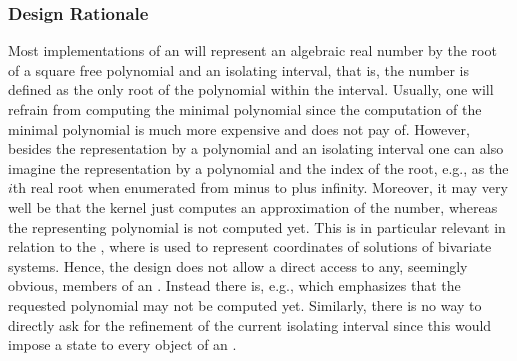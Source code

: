 \subsubsection{Design Rationale}

Most implementations of an  will represent
an algebraic real number by the root of a square free polynomial and
an isolating interval, that is, the number is defined as the only
root of the polynomial within the interval. Usually, one will refrain
from computing the minimal polynomial since the computation of the
minimal polynomial is much more expensive and does not pay of. However,
besides the representation by a polynomial and an isolating interval
one can also imagine the representation by a polynomial and the index
of the root, e.g., as the $i$th real root when enumerated from minus
to plus infinity. Moreover, it may very well be that the kernel just
computes an approximation of the number, whereas the representing
polynomial is not computed yet. 
This is in particular relevant in relation to the ,
where  is used to represent coordinates of solutions of bivariate systems.
Hence, the design does
not allow a direct access to any, seemingly obvious, members of an
. Instead there is, e.g.,
 which emphasizes
that the requested polynomial may not be computed yet. Similarly,
there is no way to directly ask for the refinement of the current
isolating interval since this would impose a state to every object of
an .

